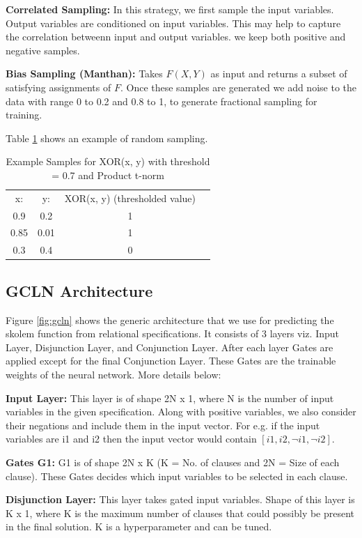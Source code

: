 \noindent\textbf{Correlated Sampling: }\label{sample3} 
In this strategy, we first sample the input variables. Output variables are conditioned on input variables. 
This may help to capture the correlation betweenn input and output variables. we keep both positive and 
negative samples.

\noindent\textbf{Bias Sampling (Manthan): }\label{sample4}
Takes $F(X, Y)$ as input and returns a subset of satisfying assignments of $F$. Once these samples are generated 
we add noise to the data with range 0 to 0.2 and 0.8 to 1, to generate fractional sampling for training.

Table \ref{tab:tnorms} shows an example of random sampling.

\begin{table}[t]
\centering
\begin{tabular}{cccc}
	x: & y: & XOR(x, y) (thresholded value)\\ 
	0.9 & 0.2 & 1\\  
	0.85 & 0.01 & 1\\
    0.3 & 0.4 & 0
\end{tabular}
\caption{Example Samples for XOR(x, y) with threshold = 0.7 and Product t-norm}
\label{tab:tnorms}
\end{table}


\subsection{GCLN Architecture}\label{gcln}
Figure \ref{fig:gcln} shows the generic architecture that we use for predicting the skolem function from relational specifications.
It consists of 3 layers viz. Input Layer, Disjunction Layer, and Conjunction Layer. After each layer Gates are applied except for the final Conjunction Layer.
These Gates are the trainable weights of the neural network. More details below:

\smallskip
\noindent\textbf{Input Layer:} This layer is of shape 2N x 1, where N is the number of input variables in the given specification. 
Along with positive variables, we also consider their negations and include them in the input vector. For e.g. if the input variables 
are i1 and i2 then the input vector would contain $[i1, i2, \neg{i1}, \neg{i2}]$.

\smallskip
\noindent\textbf{Gates G1:} G1 is of shape 2N x K (K = No. of clauses and 2N = Size of each clause).
These Gates decides which input variables to be selected in each clause.

\smallskip
\noindent\textbf{Disjunction Layer:} This layer takes gated input variables. Shape of this layer is K x 1, where K is the maximum 
number of clauses that could possibly be present in the final solution. K is a hyperparameter and can be tuned.

